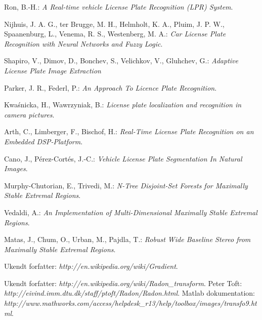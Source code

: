 \documentclass[11pt,a4paper,final]{article}
\begin{document}
\begin{thebibliography}{99}
%



 Ron, B.-H.: \textit{A Real-time vehicle License Plate Recognition (LPR) System}.

 Nijhuis, J. A. G., ter Brugge, M. H., Helmholt, K. A., Pluim, J. P. W., Spaanenburg, L., Venema, R. S., Westenberg, M. A.: \textit{Car License Plate Recognition with Neural Networks and Fuzzy Logic}.

 Shapiro, V., Dimov, D., Bonchev, S., Velichkov, V., Gluhchev, G.: \textit{Adaptive License Plate Image Extraction}

 Parker, J. R., Federl, P.: \textit{An Approach To Licence Plate Recognition}.

 Kwa\'snicka, H., Wawrzyniak, B.: \textit{License plate localization and recognition in camera pictures}.

 Arth, C., Limberger, F., Bischof, H.: \textit{Real-Time License Plate Recognition on an Embedded DSP-Platform}.

 Cano, J., Pérez-Cortés, J.-C.: \textit{Vehicle License Plate Segmentation In Natural Images}.





 Murphy-Chutorian, E., Trivedi, M.: \textit{N-Tree Disjoint-Set Forests for Maximally Stable Extremal Regions}.

 Vedaldi, A.: \textit{An Implementation of Multi-Dimensional Maximally Stable Extremal Regions}.

 Matas, J., Chum, O., Urban, M., Pajdla, T.: \textit{Robust Wide Baseline Stereo from Maximally Stable Extremal Regions}.


 Ukendt forfatter: \textit{http://en.wikipedia.org/wiki/Gradient}.

 Ukendt forfatter: \textit{http://en.wikipedia.org/wiki/Radon\_transform}.
 Peter Toft: \textit{http://eivind.imm.dtu.dk/staff/ptoft/Radon/Radon.html}.
 Matlab dokumentation: \textit{http://www.mathworks.com/access/helpdesk\_r13/help/toolbox/images/transfo9.html}.


\end{thebibliography}
\end{document}
